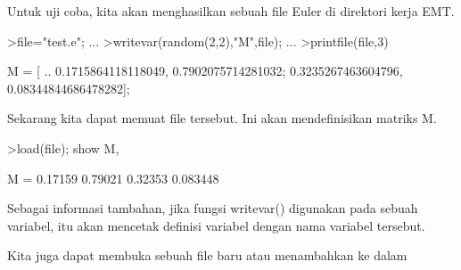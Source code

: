 \documentclass[12pt,arial,letterpaper]{book}
\begin{document}
\begin{eulercomment}
\begin{eulercomment}
\begin{eulercomment}
\begin{eulercomment}
\begin{eulercomment}
\begin{eulercomment}
\begin{eulercomment}
\begin{eulercomment}
\begin{eulercomment}
\begin{eulercomment}
\begin{eulercomment}
\begin{eulercomment}
\begin{eulercomment}
\begin{eulercomment}
\begin{eulercomment}
\begin{eulercomment}
\begin{eulercomment}
\begin{eulercomment}
\begin{eulercomment}
\begin{eulercomment}
\begin{eulercomment}
\begin{eulercomment}
\begin{eulercomment}
\begin{eulercomment}
\begin{eulercomment}
\begin{eulercomment}
\begin{eulercomment}
\begin{eulercomment}
\begin{eulercomment}
\begin{eulercomment}
\begin{eulercomment}
\begin{eulercomment}
\begin{eulercomment}
\begin{eulercomment}
\begin{eulercomment}
\begin{eulercomment}
\begin{eulercomment}
\begin{eulercomment}
\begin{eulercomment}
Untuk uji coba, kita akan menghasilkan sebuah file Euler di direktori
kerja EMT.
\end{eulercomment}
\begin{eulerprompt}
>file="test.e"; ...
>writevar(random(2,2),"M",file); ...
>printfile(file,3)
\end{eulerprompt}
\begin{euleroutput}
  M = [ ..
  0.1715864118118049, 0.7902075714281032;
  0.3235267463604796, 0.08344844686478282];
\end{euleroutput}
\begin{eulercomment}
Sekarang kita dapat memuat file tersebut. Ini akan mendefinisikan
matriks M.
\end{eulercomment}
\begin{eulerprompt}
>load(file); show M,
\end{eulerprompt}
\begin{euleroutput}
  M = 
    0.17159   0.79021 
    0.32353  0.083448 
\end{euleroutput}
\begin{eulercomment}
Sebagai informasi tambahan, jika fungsi writevar() digunakan pada
sebuah variabel, itu akan mencetak definisi variabel dengan nama
variabel tersebut.
\end{eulercomment}
\begin{eulercomment}
Kita juga dapat membuka sebuah file baru atau menambahkan ke dalam

\end{eulercomment}
\end{eulercomment}
\end{eulercomment}
\end{eulercomment}
\end{eulercomment}
\end{eulercomment}
\end{eulercomment}
\end{eulercomment}
\end{eulercomment}
\end{eulercomment}
\end{eulercomment}
\end{eulercomment}
\end{eulercomment}
\end{eulercomment}
\end{eulercomment}
\end{eulercomment}
\end{eulercomment}
\end{eulercomment}
\end{eulercomment}
\end{eulercomment}
\end{eulercomment}
\end{eulercomment}
\end{eulercomment}
\end{eulercomment}
\end{eulercomment}
\end{eulercomment}
\end{eulercomment}
\end{eulercomment}
\end{eulercomment}
\end{eulercomment}
\end{eulercomment}
\end{eulercomment}
\end{eulercomment}
\end{eulercomment}
\end{eulercomment}
\end{eulercomment}
\end{eulercomment}
\end{eulercomment}
\end{eulercomment}
\end{document}
